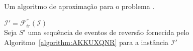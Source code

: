 \begin{algorithm}[!tbh]
  \caption{Um algoritmo de aproximação para o problema \SbFIR{}.\label{algorithm:BSOTINLZ}}
  $\mathcal{I}' = \mathcal{F}_{ir}^{''}(\mathcal{I})$ \\
  Seja $S'$ uma sequência de eventos de reversão fornecida pelo Algoritmo~\ref{algorithm:AKKUXQNR} para a instância $\mathcal{I}'$ \\
\end{algorithm}